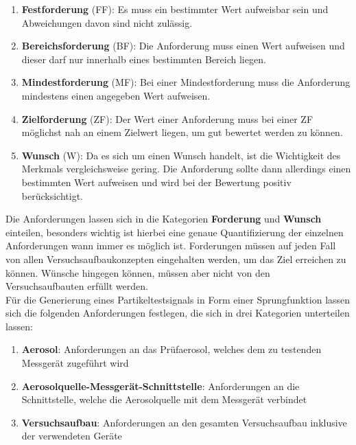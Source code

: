 \begin{enumerate}
	\item \textbf{Festforderung} (FF): Es muss ein bestimmter Wert aufweisbar sein und Abweichungen davon sind nicht zul\"{a}ssig.
	
	\item \textbf{Bereichsforderung} (BF): Die Anforderung muss einen Wert aufweisen und dieser darf nur innerhalb eines bestimmten Bereich liegen.
	
	\item \textbf{Mindestforderung} (MF): Bei einer Mindestforderung muss die Anforderung mindestens einen angegeben Wert aufweisen.
	
	\item \textbf{Zielforderung} (ZF): Der Wert einer Anforderung muss bei einer ZF m\"{o}glichst nah an einem Zielwert liegen, um gut bewertet werden zu k\"{o}nnen.
	
	\item \textbf{Wunsch} (W): Da es sich um einen Wunsch handelt, ist die Wichtigkeit des Merkmals vergleichsweise gering. Die Anforderung sollte dann allerdings einen bestimmten Wert aufweisen und wird bei der Bewertung positiv ber\"{u}cksichtigt. 
\end{enumerate}
Die Anforderungen lassen sich in die Kategorien \textbf{Forderung} und \textbf{Wunsch} einteilen, besonders wichtig ist hierbei eine genaue Quantifizierung der einzelnen Anforderungen wann immer es m\"{o}glich ist. Forderungen m\"{u}ssen auf jeden Fall von allen Versuchsaufbaukonzepten eingehalten werden, um das Ziel erreichen zu k\"{o}nnen. W\"{u}nsche hingegen k\"{o}nnen, m\"{u}ssen aber nicht von den Versuchsaufbauten erf\"{u}llt werden.\\
F\"{u}r die Generierung eines Partikeltestsignals in Form einer Sprungfunktion lassen sich die folgenden Anforderungen festlegen, die sich in drei Kategorien unterteilen lassen:
\begin{enumerate}
	\item \textbf{Aerosol}: Anforderungen an das Pr\"{u}faerosol, welches dem zu testenden Messger\"{a}t zugef\"{u}hrt wird
	\item \textbf{Aerosolquelle-Messger\"{a}t-Schnittstelle}: Anforderungen an die Schnittstelle, welche die Aerosolquelle mit dem Messger\"{a}t verbindet
	\item \textbf{Versuchsaufbau}: Anforderungen an den gesamten Versuchsaufbau inklusive der verwendeten Ger\"{a}te
\end{enumerate}

